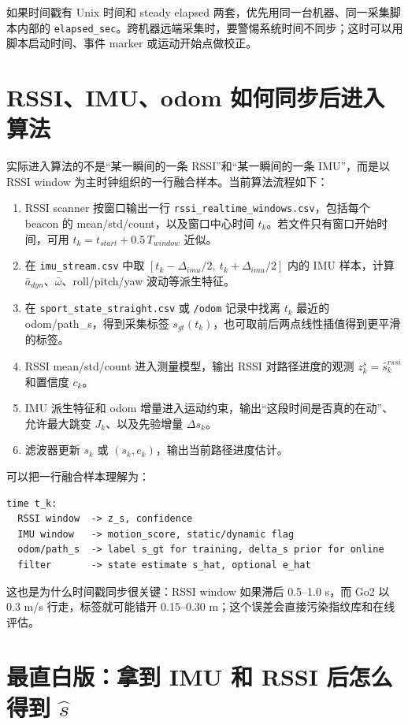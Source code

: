 \documentclass[11pt,a4paper,openany]{report}
\newcommand{\file}[1]{\nolinkurl{#1}}
\newcommand{\topic}[1]{\nolinkurl{#1}}
\newcommand{\csvcol}[1]{\nolinkurl{#1}}
\begin{document}
如果时间戳有 Unix 时间和 steady elapsed 两套，优先用同一台机器、同一采集脚本内部的 \csvcol{elapsed_sec}。跨机器远端采集时，要警惕系统时间不同步；这时可以用脚本启动时间、事件 marker 或运动开始点做校正。

\section{RSSI、IMU、odom 如何同步后进入算法}

实际进入算法的不是“某一瞬间的一条 RSSI”和“某一瞬间的一条 IMU”，而是以 RSSI window 为主时钟组织的一行融合样本。当前算法流程如下：

\begin{enumerate}
  \item RSSI scanner 按窗口输出一行 \file{rssi_realtime_windows.csv}，包括每个 beacon 的 mean/std/count，以及窗口中心时间 \(t_k\)。若文件只有窗口开始时间，可用 \(t_k=t_{start}+0.5\,T_{window}\) 近似。
  \item 在 \file{imu_stream.csv} 中取 \([t_k-\Delta_{imu}/2,\ t_k+\Delta_{imu}/2]\) 内的 IMU 样本，计算 \(\bar{a}_{dyn}\)、\(\bar{\omega}\)、roll/pitch/yaw 波动等派生特征。
  \item 在 \file{sport_state_straight.csv} 或 \topic{/odom} 记录中找离 \(t_k\) 最近的 odom/path\_s，得到采集标签 \(s_{gt}(t_k)\)，也可取前后两点线性插值得到更平滑的标签。
  \item RSSI mean/std/count 进入测量模型，输出 RSSI 对路径进度的观测 \(z_k^s=\hat{s}_{k}^{rssi}\) 和置信度 \(c_k\)。
  \item IMU 派生特征和 odom 增量进入运动约束，输出“这段时间是否真的在动”、允许最大跳变 \(J_k\)、以及先验增量 \(\Delta s_k\)。
  \item 滤波器更新 \(s_k\) 或 \((s_k,e_k)\)，输出当前路径进度估计。
\end{enumerate}

可以把一行融合样本理解为：

\begin{lstlisting}
time t_k:
  RSSI window  -> z_s, confidence
  IMU window   -> motion_score, static/dynamic flag
  odom/path_s  -> label s_gt for training, delta_s prior for online
  filter       -> state estimate s_hat, optional e_hat
\end{lstlisting}

这也是为什么时间戳同步很关键：RSSI window 如果滞后 0.5--1.0 s，而 Go2 以 0.3 m/s 行走，标签就可能错开 0.15--0.30 m；这个误差会直接污染指纹库和在线评估。

\section{最直白版：拿到 IMU 和 RSSI 后怎么得到 \texorpdfstring{\(\hat{s}\)}{s_hat}}
\end{document}
